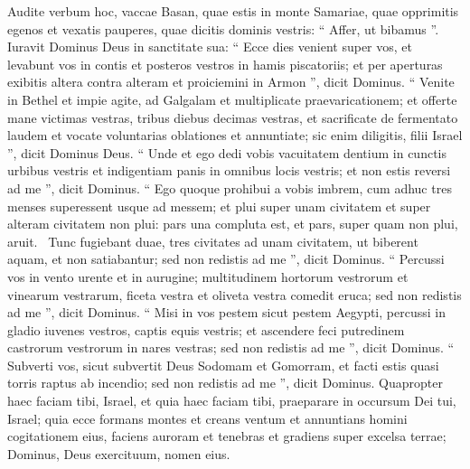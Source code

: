 \begin{biblechapter}
\begin{biblechapter}
\begin{biblechapter}
\begin{biblechapter}
 \verse Audite verbum hoc,
 vaccae Basan,
 quae estis in monte Samariae,
 quae opprimitis egenos
 et vexatis pauperes,
 quae dicitis dominis vestris:
 “ Affer, ut bibamus ”.
 \verse Iuravit Dominus Deus
 in sanctitate sua:
 “ Ecce dies venient super vos,
 et levabunt vos in contis
 et posteros vestros in hamis piscatoriis;
 \verse et per aperturas exibitis altera contra alteram
 et proiciemini in Armon ”,
 dicit Dominus.
 \verse “ Venite in Bethel et impie agite,
 ad Galgalam et multiplicate praevaricationem;
 et offerte mane victimas vestras,
 tribus diebus decimas vestras,
 \verse et sacrificate de fermentato laudem
 et vocate voluntarias oblationes et annuntiate;
 sic enim diligitis, filii Israel ”,
 dicit Dominus Deus.
 \verse “ Unde et ego dedi vobis
 vacuitatem dentium in cunctis urbibus vestris
 et indigentiam panis in omnibus locis vestris;
 et non estis reversi ad me ”,
 dicit Dominus.
 \verse “ Ego quoque prohibui a vobis imbrem,
 cum adhuc tres menses superessent usque ad messem;
 et plui super unam civitatem
 et super alteram civitatem non plui: pars una compluta est,
 et pars, super quam non plui, aruit. 
 \verse Tunc fugiebant duae, tres civitates
 ad unam civitatem, ut biberent aquam,
 et non satiabantur;
 sed non redistis ad me ”,
 dicit Dominus.
 \verse “ Percussi vos in vento urente et in aurugine;
 multitudinem hortorum vestrorum et vinearum vestrarum,
 ficeta vestra et oliveta vestra
 comedit eruca;
 sed non redistis ad me ”,
 dicit Dominus.
 \verse “ Misi in vos pestem
 sicut pestem Aegypti,
 percussi in gladio iuvenes vestros,
 captis equis vestris;
 et ascendere feci putredinem
 castrorum vestrorum in nares vestras;
 sed non redistis ad me ”,
 dicit Dominus.
 \verse “ Subverti vos,
 sicut subvertit Deus Sodomam et Gomorram,
 et facti estis quasi torris
 raptus ab incendio;
 sed non redistis ad me ”,
 dicit Dominus.
 \verse Quapropter haec faciam tibi, Israel,
 et quia haec faciam tibi,
 praeparare in occursum Dei tui, Israel;
 \verse quia ecce formans montes et creans ventum
 et annuntians homini cogitationem eius,
 faciens auroram et tenebras
 et gradiens super excelsa terrae;
 Dominus, Deus exercituum, nomen eius.
 

\end{biblechapter}
\end{biblechapter}
\end{biblechapter}
\end{biblechapter}
